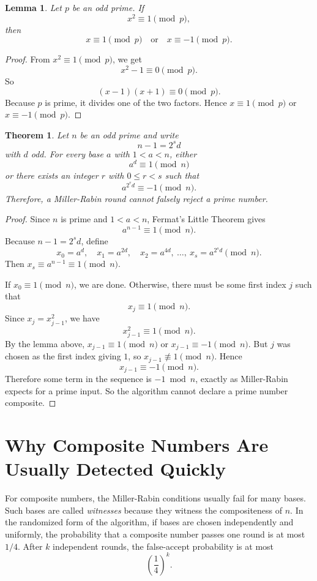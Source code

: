 \documentclass[12pt,a4paper]{report}
\newtheorem{lemma}{Lemma}[chapter]
\newtheorem{theorem}{Theorem}[chapter]
\begin{document}
\begin{lemma}
Let \(p\) be an odd prime. If
\[
x^2 \equiv 1 \pmod{p},
\]
then
\[
x \equiv 1 \pmod{p}
\quad \text{or} \quad
x \equiv -1 \pmod{p}.
\]
\end{lemma}

\begin{proof}
From \(x^2 \equiv 1 \pmod{p}\), we get
\[
x^2 - 1 \equiv 0 \pmod{p}.
\]
So
\[
(x-1)(x+1) \equiv 0 \pmod{p}.
\]
Because \(p\) is prime, it divides one of the two factors. Hence \(x \equiv 1 \pmod{p}\) or \(x \equiv -1 \pmod{p}\).
\end{proof}

\begin{theorem}
Let \(n\) be an odd prime and write
\[
n-1 = 2^s d
\]
with \(d\) odd. For every base \(a\) with \(1 < a < n\), either
\[
a^d \equiv 1 \pmod{n}
\]
or there exists an integer \(r\) with \(0 \le r < s\) such that
\[
a^{2^r d} \equiv -1 \pmod{n}.
\]
Therefore, a Miller-Rabin round cannot falsely reject a prime number.
\end{theorem}

\begin{proof}
Since \(n\) is prime and \(1 < a < n\), Fermat's Little Theorem gives
\[
a^{n-1} \equiv 1 \pmod{n}.
\]
Because \(n-1=2^s d\), define
\[
x_0 = a^d,\quad x_1 = a^{2d},\quad x_2 = a^{4d},\ \dots,\ x_s = a^{2^s d}
\pmod{n}.
\]
Then \(x_s \equiv a^{n-1} \equiv 1 \pmod{n}\).

If \(x_0 \equiv 1 \pmod{n}\), we are done. Otherwise, there must be some first index \(j\) such that
\[
x_j \equiv 1 \pmod{n}.
\]
Since \(x_j = x_{j-1}^2\), we have
\[
x_{j-1}^2 \equiv 1 \pmod{n}.
\]
By the lemma above, \(x_{j-1} \equiv 1 \pmod{n}\) or \(x_{j-1} \equiv -1 \pmod{n}\). But \(j\) was chosen as the first index giving \(1\), so \(x_{j-1} \not\equiv 1 \pmod{n}\). Hence
\[
x_{j-1} \equiv -1 \pmod{n}.
\]
Therefore some term in the sequence is \(-1 \bmod n\), exactly as Miller-Rabin expects for a prime input. So the algorithm cannot declare a prime number composite.
\end{proof}

\section{Why Composite Numbers Are Usually Detected Quickly}
For composite numbers, the Miller-Rabin conditions usually fail for many bases. Such bases are called \emph{witnesses} because they witness the compositeness of \(n\). In the randomized form of the algorithm, if bases are chosen independently and uniformly, the probability that a composite number passes one round is at most \(1/4\). After \(k\) independent rounds, the false-accept probability is at most
\[
\left(\frac{1}{4}\right)^k.
\]
\end{document}
